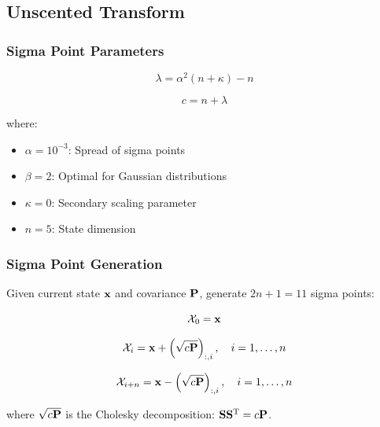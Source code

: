 \subsection{Unscented Transform}

\subsubsection{Sigma Point Parameters}

\begin{equation}
\lambda = \alpha^2 (n + \kappa) - n
\label{eq:lambda}
\end{equation}

\begin{equation}
c = n + \lambda
\label{eq:c_param}
\end{equation}

where:
\begin{itemize}
    \item $\alpha = 10^{-3}$: Spread of sigma points
    \item $\beta = 2$: Optimal for Gaussian distributions
    \item $\kappa = 0$: Secondary scaling parameter
    \item $n = 5$: State dimension
\end{itemize}

\subsubsection{Sigma Point Generation}

Given current state $\mathbf{x}$ and covariance $\mathbf{P}$, generate $2n + 1 = 11$ sigma points:

\begin{equation}
\mathcal{X}_0 = \mathbf{x}
\label{eq:sigma_0}
\end{equation}

\begin{equation}
\mathcal{X}_i = \mathbf{x} + \left(\sqrt{c \mathbf{P}}\right)_{:,i}, \quad i = 1, \ldots, n
\label{eq:sigma_positive}
\end{equation}

\begin{equation}
\mathcal{X}_{i+n} = \mathbf{x} - \left(\sqrt{c \mathbf{P}}\right)_{:,i}, \quad i = 1, \ldots, n
\label{eq:sigma_negative}
\end{equation}

where $\sqrt{c \mathbf{P}}$ is the Cholesky decomposition: $\mathbf{S}\mathbf{S}^\mathrm{T} = c\mathbf{P}$.

